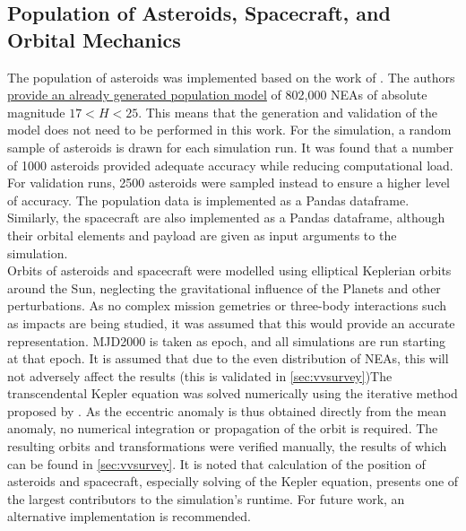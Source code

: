 \subsection{Population of Asteroids, Spacecraft, and Orbital Mechanics}
The population of asteroids was implemented based on the work of \cite{GranvikPopulation}. The authors \href{http://www.iki.fi/mgranvik/data/Granvik+\_2018\_Icarus}{provide an already generated population model} of 802,000 NEAs of absolute magnitude $17 < H < 25$. This means that the generation and validation of the model does not need to be performed in this work. For the simulation, a random sample of asteroids is drawn for each simulation run. It was found that a number of 1000 asteroids provided adequate accuracy while reducing computational load. For validation runs, 2500 asteroids were sampled instead to ensure a higher level of accuracy.  The population data is implemented as a Pandas dataframe. Similarly, the spacecraft are also implemented as a Pandas dataframe, although their orbital elements and payload are given as input arguments to the simulation. \\

Orbits of asteroids and spacecraft were modelled using elliptical Keplerian orbits around the Sun, neglecting the gravitational influence of the Planets and other perturbations. As no complex mission gemetries or three-body interactions such as impacts are being studied, it was assumed that this would provide an accurate representation. MJD2000 is taken as epoch, and all simulations are run starting at that epoch. It is assumed that due to the even distribution of NEAs, this will not adversely affect the results (this is validated in \autoref{sec:vvsurvey})The transcendental Kepler equation was solved numerically using the iterative method proposed by \cite{KeplerEquation}. As the eccentric anomaly is thus obtained directly from the mean anomaly, no numerical integration or propagation of the orbit is required. The resulting orbits and transformations were verified manually, the results of which can be found in \autoref{sec:vvsurvey}. It is noted that calculation of the position of asteroids and spacecraft, especially solving of the Kepler equation, presents one of the largest contributors to the simulation's runtime. For future work, an alternative implementation is recommended.


